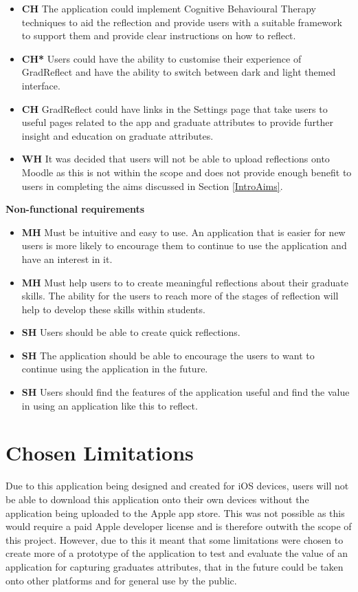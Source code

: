 \documentclass{l4proj}
\begin{document}
\begin{itemize}
    \item \textbf{CH} The application could implement Cognitive Behavioural Therapy techniques to aid the reflection and provide users with a suitable framework to support them and provide clear instructions on how to reflect. 
    \item \textbf{CH*} Users could have the ability to customise their experience of GradReflect and have the ability to switch between dark and light themed interface.
    \item \textbf{CH} GradReflect could have links in the Settings page that take users to useful pages related to the app and graduate attributes to provide further insight and education on graduate attributes.
    
    \item \textbf{WH} It was decided that users will not be able to upload reflections onto Moodle as this is not within the scope and does not provide enough benefit to users in completing the aims discussed in Section \ref{IntroAims}.
\end{itemize}

\textbf{Non-functional requirements}
\begin{itemize}
    \item \textbf{MH} Must be intuitive and easy to use. An application that is easier for new users is more likely to encourage them to continue to use the application and have an interest in it.
    \item \textbf{MH} Must help users to to create meaningful reflections about their graduate skills. The ability for the users to reach more of the stages of reflection will help to develop these skills within students.
    \item \textbf{SH} Users should be able to create quick reflections.
    \item \textbf{SH} The application should be able to encourage the users to want to continue using the application in the future.
    \item \textbf{SH} Users should find the features of the application useful and find the value in using an application like this to reflect. 
\end{itemize}


\section{Chosen Limitations}

Due to this application being designed and created for iOS devices, users will not be able to download this application onto their own devices without the application being uploaded to the Apple app store. This was not possible as this would require a paid Apple developer license and is therefore outwith the scope of this project. However, due to this it meant that some limitations were chosen to create more of a prototype of the application to test and evaluate the value of an application for capturing graduates attributes, that in the future could be taken onto other platforms and for general use by the public.
\end{document}
